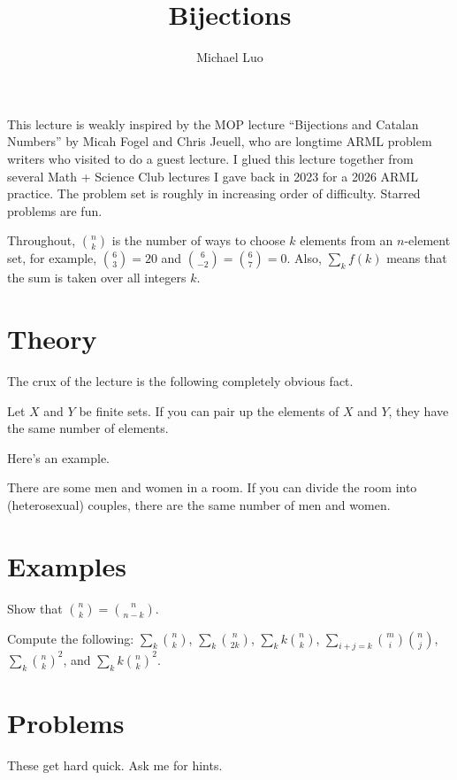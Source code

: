\documentclass[11pt]{scrartcl}
\title{Bijections}
\author{Michael Luo}
\begin{document}
This lecture is weakly inspired by the MOP lecture ``Bijections and Catalan Numbers'' by Micah Fogel and Chris Jeuell, who are longtime ARML problem writers who visited to do a guest lecture. I glued this lecture together from several Math + Science Club lectures I gave back in 2023 for a 2026 ARML practice. The problem set is roughly in increasing order of difficulty. Starred problems are fun.

Throughout, $\binom nk$ is the number of ways to choose $k$ elements from an $n$-element set, for example, $\binom 63 = 20$ and $\binom 6{-2} = \binom 67 = 0$. Also, $\sum_k f(k)$ means that the sum is taken over all integers $k$.

\section{Theory}

The crux of the lecture is the following completely obvious fact.
\begin{fact}
	Let $X$ and $Y$ be finite sets. If you can pair up the elements of $X$ and $Y$, they have the same number of elements.
\end{fact}

Here's an example.
\begin{example}
	There are some men and women in a room. If you can divide the room into (heterosexual) couples, there are the same number of men and women.
\end{example}

\section{Examples}

\begin{example}
	Show that $\binom nk = \binom n{n - k}$.
\end{example}

\begin{example}
	Compute the following: $\sum_k\binom nk$, $\sum_k\binom n{2k}$, $\sum_kk\binom nk$, $\sum_{i + j = k}\binom mi\binom nj$, $\sum_k \binom nk^2$, and $\sum_k k\binom nk^2$.
\end{example}

\section{Problems}

These get hard quick. Ask me for hints.
\end{document}
